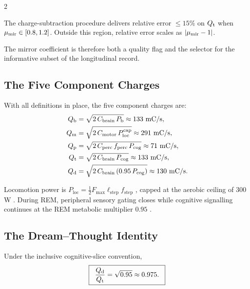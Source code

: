 \begin{multicols}{2}
\begin{theorem}
\label{thm:ch08-mirror}
The charge-subtraction procedure delivers relative error $\leq 15\%$ on $Q_{\mathrm{t}}$ when $\mu_{\mathrm{mir}} \in [0.8, 1.2]$. Outside this region, relative error scales as $|\mu_{\mathrm{mir}} - 1|$.
\end{theorem}

The mirror coefficient is therefore both a quality flag and the selector for the informative subset of the longitudinal record.

\subsection{The Five Component Charges}

With all definitions in place, the five component charges are:
\begin{align}
Q_{\mathrm{b}} &= \sqrt{2\,C_{\mathrm{brain}}\,P_{\mathrm{b}}} \approx 133~\text{mC/s}, \label{eq:ch08-Qb}\\
Q_{\mathrm{m}} &= \sqrt{2\,C_{\mathrm{motor}}\,P_{\mathrm{loc}}^{\mathrm{cap}}} \approx 291~\text{mC/s}, \label{eq:ch08-Qm}\\
Q_{\mathrm{p}} &= \sqrt{2\,C_{\mathrm{perc}}\,f_{\mathrm{perc}}\,P_{\mathrm{cog}}} \approx 71~\text{mC/s}, \label{eq:ch08-Qp}\\
Q_{\mathrm{t}} &= \sqrt{2\,C_{\mathrm{brain}}\,P_{\mathrm{cog}}} \approx 133~\text{mC/s}, \label{eq:ch08-Qt}\\
Q_{\mathrm{d}} &= \sqrt{2\,C_{\mathrm{brain}}\,(0.95\,P_{\mathrm{cog}})} \approx 130~\text{mC/s}. \label{eq:ch08-Qd}
\end{align}

Locomotion power is $P_{\mathrm{loc}} = \frac{1}{2}F_{\max}\ell_{\mathrm{step}}f_{\mathrm{step}}$ \citep{cavagna1977, kram1990}, capped at the aerobic ceiling of $300$\,W \citep{jones2011}. During REM, peripheral sensory gating closes \citep{llinas1993, rechtschaffen1968} while cognitive signalling continues at the REM metabolic multiplier $0.95$ \citep{maquet1990, madsen1991, braun1997}.

\subsection{The Dream--Thought Identity}

\begin{theorem}
\label{thm:ch08-dream-thought}
Under the inclusive cognitive-slice convention,
\begin{equation}
\boxed{\;\;\frac{Q_{\mathrm{d}}}{Q_{\mathrm{t}}} = \sqrt{0.95} \approx 0.975.\;\;}
\label{eq:ch08-ratio}
\end{equation}
\end{theorem}


\end{multicols}
